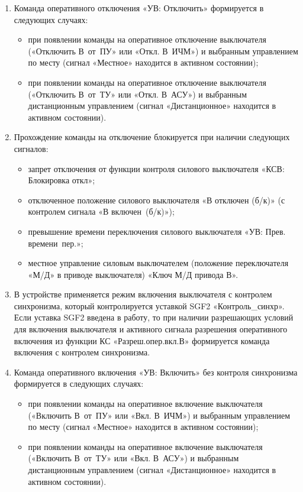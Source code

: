 \begin{enumerate}
\begin{enumerate}
\item
Команда оперативного отключения «УВ: Отключить» формируется в следующих случаях:
\begin{itemize}
	\item при появлении команды на оперативное отключение выключателя («Отключить В~от~ПУ» или «Откл. В~ИЧМ») и выбранным управлением по месту (сигнал «Местное» находится в активном состоянии);
	\item при появлении команды на оперативное отключение выключателя («Отключить В~от~ТУ» или «Откл. В~АСУ») и выбранным дистанционным управлением (сигнал «Дистанционное» находится в активном состоянии).
\end{itemize}
\item
Прохождение команды на отключение блокируется при наличии следующих сигналов:
\begin{itemize}
	\item запрет отключения от функции контроля силового выключателя «КСВ: Блокировка откл»;
	\item отключенное положение силового выключателя «В отключен (б/к)» (с контролем сигнала «В включен~(б/к)»);
	\item превышение времени переключения силового выключателя «УВ: Прев. времени~пер.»;
	\item местное управление силовым выключателем (положение переключателя «М/Д» в приводе выключателя) «Ключ М/Д привода В».
\end{itemize}
\item
В устройстве применяется режим включения выключателя с контролем синхронизма, который контролируется уставкой SGF2 «Контроль\_синхр». Если уставка SGF2 введена в работу, то при наличии разрешающих условий для включения выключателя и активного сигнала разрешения оперативного включения из функции КС «Разреш.опер.вкл.В» формируется команда включения с контролем синхронизма.

\item
Команда оперативного включения «УВ: Включить» без контроля синхронизма формируется в следующих случаях:
\begin{itemize}
	\item при появлении команды на оперативное включение выключателя («Включить В~от~ПУ» или «Вкл. В~ИЧМ») и выбранным управлением по месту (сигнал «Местное» находится в активном состоянии);
	\item при появлении команды на оперативное включение выключателя («Включить В~от~ТУ» или «Вкл. В~АСУ») и выбранным дистанционным управлением (сигнал «Дистанционное» находится в активном состоянии).
\end{itemize}


\end{enumerate}
\end{enumerate}
